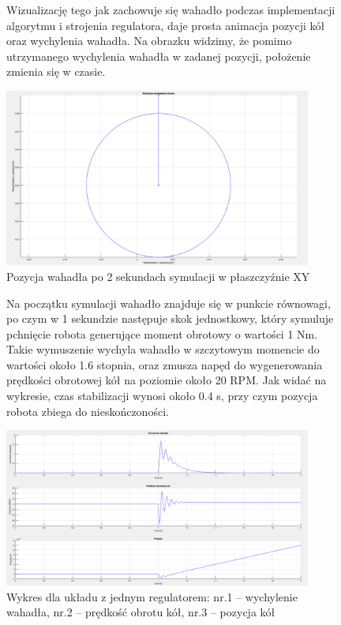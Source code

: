 \begin{figure}
    Wizualizację tego jak zachowuje się wahadło podczas implementacji algorytmu i strojenia regulatora, daje prosta animacja pozycji kół oraz wychylenia wahadła. Na obrazku widzimy, że pomimo utrzymanego wychylenia wahadła w zadanej pozycji, położenie zmienia się w czasie.
    \\ 
    \begin{center}
        \includegraphics[width=0.9\textwidth]{Rysunki/Rozdzial02/Pojedynczy_PID_animacja.png}
	    \caption{Pozycja wahadła po 2 sekundach symulacji w płaszczyźnie XY}
    \end{center}
	\label{PID animacja}
\end{figure}

\begin{figure}
    Na początku symulacji wahadło znajduje się w punkcie równowagi, po czym w 1 sekundzie następuje skok jednostkowy, który symuluje pchnięcie robota generujące moment obrotowy o wartości 1 Nm. Takie wymuszenie wychyla wahadło w szczytowym momencie do wartości około 1.6 stopnia, oraz zmusza napęd do wygenerowania prędkości obrotowej kół na poziomie około 20 RPM. Jak widać na wykresie, czas stabilizacji wynosi około 0.4 s, przy czym pozycja robota zbiega do nieskończoności.
    \\
    \begin{center}
        \includegraphics[width=0.9\textwidth]{Rysunki/Rozdzial02/Pojedynczy_PID_wykresy.png}
	    \caption{Wykres dla układu z jednym regulatorem: nr.1 -- wychylenie wahadła, nr.2 -- prędkość obrotu kół, nr.3 -- pozycja kół}
    \end{center}
	\label{Wykresy PID1}
\end{figure}

